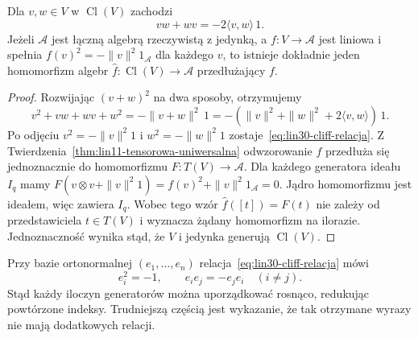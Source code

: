 \begin{twierdzenie}
\label{thm:lin30-cliff-relacje}
Dla $v,w\in V$ w $\operatorname{Cl}(V)$ zachodzi
\begin{equation}\label{eq:lin30-cliff-relacja}
 vw+wv=-2\langle v,w\rangle\,1.
\end{equation}
Jeżeli $\mathcal A$ jest łączną algebrą rzeczywistą
z jedynką, a $f:V\to\mathcal A$ jest liniowa i spełnia
$f(v)^2=-\|v\|^2 1_{\mathcal A}$ dla każdego $v$,
to istnieje dokładnie jeden homomorfizm algebr
$\widehat f:\operatorname{Cl}(V)\to\mathcal A$
przedłużający $f$.
\end{twierdzenie}
\begin{proof}
Rozwijając $(v+w)^2$ na dwa sposoby, otrzymujemy
\[
 v^2+vw+wv+w^2=-\|v+w\|^2\,1
  =-(\|v\|^2+\|w\|^2+2\langle v,w\rangle)\,1.
\]
Po odjęciu $v^2=-\|v\|^2 1$ i
$w^2=-\|w\|^2 1$ zostaje~\eqref{eq:lin30-cliff-relacja}.
Z Twierdzenia~\ref{thm:lin11-tensorowa-uniwersalna}
odwzorowanie $f$ przedłuża się jednoznacznie do homomorfizmu
$F:T(V)\to\mathcal A$. Dla każdego generatora ideału
$I_q$ mamy
$F(v\otimes v+\|v\|^2 1)
 =f(v)^2+\|v\|^2 1_{\mathcal A}=0$.
Jądro homomorfizmu jest ideałem, więc zawiera $I_q$.
Wobec tego wzór $\widehat f([t])=F(t)$
nie zależy od przedstawiciela $t\in T(V)$
i wyznacza żądany homomorfizm na ilorazie.
Jednoznaczność wynika stąd, że $V$ i jedynka
generują $\operatorname{Cl}(V)$.
\end{proof}

Przy bazie ortonormalnej $(e_1,\ldots,e_n)$
relacja~\eqref{eq:lin30-cliff-relacja} mówi
\begin{equation}\label{eq:lin30-cliff-orto}
 e_i^2=-1,\qquad e_ie_j=-e_je_i\quad(i\ne j).
\end{equation}
Stąd każdy iloczyn generatorów można uporządkować
rosnąco, redukując powtórzone indeksy.
Trudniejszą częścią jest wykazanie, że tak otrzymane
wyrazy nie mają dodatkowych relacji.

